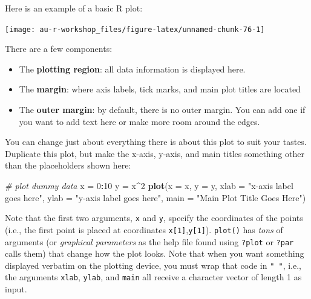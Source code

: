 \documentclass[]{book}
\newenvironment{Shaded}{\begin{snugshade}}{\end{snugshade}}
\newcommand{\KeywordTok}[1]{\textcolor[rgb]{0.13,0.29,0.53}{\textbf{#1}}}
\newcommand{\DataTypeTok}[1]{\textcolor[rgb]{0.13,0.29,0.53}{#1}}
\newcommand{\DecValTok}[1]{\textcolor[rgb]{0.00,0.00,0.81}{#1}}
\newcommand{\StringTok}[1]{\textcolor[rgb]{0.31,0.60,0.02}{#1}}
\newcommand{\CommentTok}[1]{\textcolor[rgb]{0.56,0.35,0.01}{\textit{#1}}}
\newcommand{\OperatorTok}[1]{\textcolor[rgb]{0.81,0.36,0.00}{\textbf{#1}}}
\newcommand{\NormalTok}[1]{#1}
\providecommand{\tightlist}{%
  \setlength{\itemsep}{0pt}\setlength{\parskip}{0pt}}
\theoremstyle{definition}
\theoremstyle{definition}
\theoremstyle{definition}
\theoremstyle{remark}
\begin{document}
Here is an example of a basic R plot:

\begin{center}\texttt{[image: au-r-workshop\_files/figure-latex/unnamed-chunk-76-1]} \end{center}

There are a few components:

\begin{itemize}
\tightlist
\item
  The \textbf{plotting region}: all data information is displayed here.
\item
  The \textbf{margin}: where axis labels, tick marks, and main plot
  titles are located
\item
  The \textbf{outer margin}: by default, there is no outer margin. You
  can add one if you want to add text here or make more room around the
  edges.
\end{itemize}

You can change just about everything there is about this plot to suit
your tastes. Duplicate this plot, but make the x-axis, y-axis, and main
titles something other than the placeholders shown here:

\begin{Shaded}
\begin{Highlighting}[]
\CommentTok{# plot dummy data}
\NormalTok{x =}\StringTok{ }\DecValTok{0}\OperatorTok{:}\DecValTok{10}
\NormalTok{y =}\StringTok{ }\NormalTok{x}\OperatorTok{^}\DecValTok{2}
\KeywordTok{plot}\NormalTok{(}\DataTypeTok{x =}\NormalTok{ x, }\DataTypeTok{y =}\NormalTok{ y,}
     \DataTypeTok{xlab =} \StringTok{"x-axis label goes here"}\NormalTok{, }
     \DataTypeTok{ylab =} \StringTok{"y-axis label goes here"}\NormalTok{,}
     \DataTypeTok{main =} \StringTok{"Main Plot Title Goes Here"}\NormalTok{)}
\end{Highlighting}
\end{Shaded}

Note that the first two arguments, \texttt{x} and \texttt{y}, specify
the coordinates of the points (i.e., the first point is placed at
coordinates \texttt{x{[}1{]}},\texttt{y{[}1{]}}). \texttt{plot()} has
\emph{tons} of arguments (or \emph{graphical parameters} as the help
file found using \texttt{?plot} or \texttt{?par} calls them) that change
how the plot looks. Note that when you want something displayed verbatim
on the plotting device, you must wrap that code in \texttt{"\ "}, i.e.,
the arguments \texttt{xlab}, \texttt{ylab}, and \texttt{main} all
receive a character vector of length 1 as input.
\end{document}
